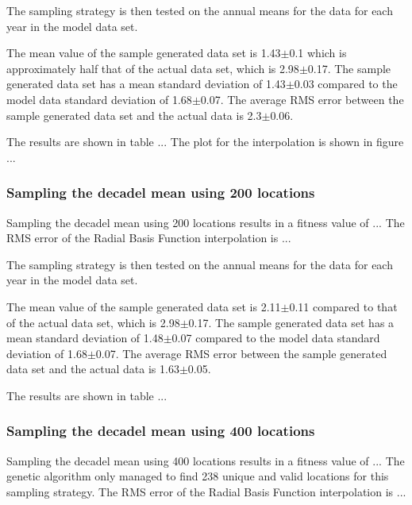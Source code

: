 \documentclass[11pt, a4paper]{article}
\numberwithin{figure}{section}
\numberwithin{table}{section}
\begin{document}
The sampling strategy is then tested on the annual means for the data
for each year in the model data set.

The mean value of the sample generated data set is
1.43$\pm$0.1 which is approximately half that of the actual data set, 
which is 2.98$\pm$0.17.
The sample generated data set has a mean standard deviation of 
1.43$\pm$0.03 compared to the model data standard deviation of 
1.68$\pm$0.07.
The average RMS error between the sample generated data set and the 
actual data is 2.3$\pm$0.06.

The results are shown in table ...
The plot for the interpolation is shown in figure ...



\subsubsection{Sampling the decadel mean using 200 locations}
Sampling the decadel mean using 200 locations results in a fitness
value of ...
The RMS error of the Radial Basis Function interpolation is ...

The sampling strategy is then tested on the annual means for the data
for each year in the model data set.


The mean value of the sample generated data set is
2.11$\pm$0.11 compared to that of the actual data set, 
which is 2.98$\pm$0.17.
The sample generated data set has a mean standard deviation of 
1.48$\pm$0.07 compared to the model data standard deviation of 
1.68$\pm$0.07.
The average RMS error between the sample generated data set and the 
actual data is 1.63$\pm$0.05.

The results are shown in table ...



\subsubsection{Sampling the decadel mean using 400 locations}
Sampling the decadel mean using 400 locations results in a fitness
value of ...
The genetic algorithm only managed to find 238 unique and valid 
locations for this sampling strategy.
The RMS error of the Radial Basis Function interpolation is ...
\end{document}
